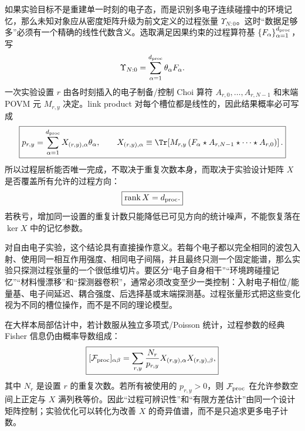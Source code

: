 如果实验目标不是重建单一时刻的电子态，而是识别多电子连续碰撞中的环境记忆，那么未知对象应从密度矩阵升级为前文定义的过程张量 $\Upsilon_{N:0}$。这时“数据足够多”必须有一个精确的线性代数含义。选取满足因果约束的过程算符基 $\{F_\alpha\}_{\alpha=1}^{d_{\rm proc}}$，写
\begin{equation*}
\Upsilon_{N:0}=\sum_{\alpha=1}^{d_{\rm proc}}\theta_\alpha F_\alpha.
\end{equation*}
一次实验设置 $r$ 由各时刻插入的电子制备/控制 Choi 算符
$A_{r,0},\ldots,A_{r,N-1}$ 和末端 POVM 元 $M_{r,y}$ 决定。link product 对每个槽位都是线性的，因此结果概率必可写成
\begin{equation}
\boxed{
p_{r,y}
=\sum_{\alpha=1}^{d_{\rm proc}}
X_{(r,y),\alpha}\theta_\alpha,
\qquad
X_{(r,y),\alpha}
\equiv
\Tr\!\left[
M_{r,y}
\left(F_\alpha\star A_{r,N-1}\star\cdots\star A_{r,0}\right)
\right].}
\label{eq:process_tensor_experimental_design_matrix}
\end{equation}
所以过程层析能否唯一完成，不取决于重复次数本身，而取决于实验设计矩阵 $X$ 是否覆盖所有允许的过程方向：
\begin{equation}
\boxed{
\operatorname{rank}X=d_{\rm proc}.}
\label{eq:process_tensor_identifiability_rank}
\end{equation}
若秩亏，增加同一设置的重复计数只能降低已可见方向的统计噪声，不能恢复落在 $\ker X$ 中的记忆参数。

对自由电子实验，这个结论具有直接操作意义。若每个电子都以完全相同的波包入射、使用同一相互作用强度、相同电子间隔，并且最终只测一个固定能谱，那么实验只探测过程张量的一个很低维切片。要区分“电子自身相干”“环境跨碰撞记忆”“材料慢漂移”和“探测器卷积”，通常必须改变至少一类控制：入射电子相位/能量基、电子间延迟、耦合强度、后选择基或末端探测基。过程张量形式把这些变化视为不同的槽位操作，而不是不同的理论模型。

在大样本局部估计中，若计数服从独立多项式/Poisson 统计，过程参数的经典 Fisher 信息仍由概率导数组成：
\begin{equation}
\boxed{
[\mathcal F_{\rm proc}]_{\alpha\beta}
=\sum_{r,y}
\frac{N_r}{p_{r,y}}
X_{(r,y),\alpha}X_{(r,y),\beta},}
\label{eq:process_tensor_fisher_information}
\end{equation}
其中 $N_r$ 是设置 $r$ 的重复次数。若所有被使用的 $p_{r,y}>0$，则
$\mathcal F_{\rm proc}$ 在允许参数空间上正定与 $X$ 满列秩等价。因此“过程可辨识性”和“有限方差估计”由同一个设计矩阵控制；实验优化可以转化为改善 $X$ 的奇异值谱，而不是只追求更多电子计数。

